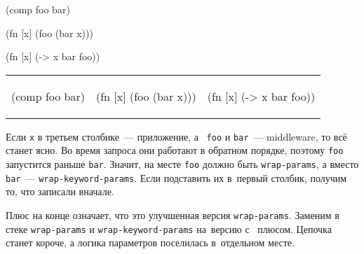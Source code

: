 \ifnarrow

\begin{english}
  \begin{clojure}
(comp foo bar)
  \end{clojure}

\splitter

  \begin{clojure}
(fn [x]
  (foo (bar x)))
  \end{clojure}

\splitter

  \begin{clojure}
(fn [x] (-> x
            bar
            foo))
  \end{clojure}
\end{english}

\else

\begin{english}
\noindent
\begin{tabular}{ @{}p{3.2cm} @{}p{3.5cm} @{}p{3.5cm} }

  \begin{clojure}
(comp foo bar)
  \end{clojure}

&

  \begin{clojure}
(fn [x]
  (foo (bar x)))
  \end{clojure}

&

  \begin{clojure}
(fn [x] (-> x
            bar
            foo))
  \end{clojure}

\end{tabular}

\end{english}

\fi

Если \verb|x| в третьем столбике~--- приложение, а~ \verb|foo| и \verb|bar|~---
middleware, то всё станет ясно. Во время запроса они работают в обратном
порядке, поэтому \verb|foo| запустится раньше \verb|bar|. Значит, на месте
\verb|foo| должно быть \verb|wrap-params|, а вместо \verb|bar|~---
\verb|wrap-keyword-params|. Если подставить их в~первый столбик, получим то, что
записали вначале.

Плюс на конце означает, что это улучшенная версия \texttt{wrap\--pa\-rams}. Заменим
в стеке \texttt{wrap\--pa\-rams} и \verb|wrap-keyword-params| на~версию с~
плюсом. Цепочка станет короче, а логика параметров поселилась в~отдельном месте.

